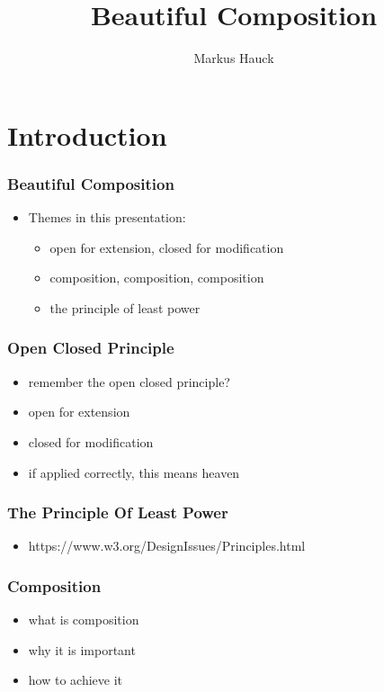 \documentclass{beamer}
\title{Beautiful Composition}
\author{Markus Hauck}
\begin{document}
\begin{frame}
  \titlepage{}
\end{frame}

\section{Introduction}\label{sec:introduction}

\begin{frame}
  \frametitle{Beautiful Composition}
  \begin{itemize}
  \item Themes in this presentation:
    \begin{itemize}
    \item open for extension, closed for modification
    \item composition, composition, composition
    \item the principle of least power
    \end{itemize}
  \end{itemize}
\end{frame}

\begin{frame}
  \frametitle{Open Closed Principle}
  \begin{itemize}
  \item remember the open closed principle?
  \item open for extension
  \item closed for modification
  \item if applied correctly, this means heaven
  \end{itemize}
\end{frame}

\begin{frame}
  \frametitle{The Principle Of Least Power}
  \begin{itemize}
  \item https://www.w3.org/DesignIssues/Principles.html
  \end{itemize}
\end{frame}

\begin{frame}
  \frametitle{Composition}
  \begin{itemize}
  \item what is composition
  \item why it is important
  \item how to achieve it
  \end{itemize}
\end{frame}
\end{document}
